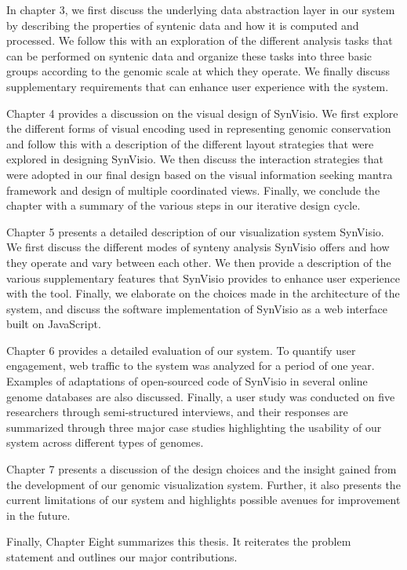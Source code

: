 In chapter 3, we first discuss the underlying data abstraction layer in our system by describing the properties of syntenic data and how it is computed and processed. We follow this with an exploration of the different analysis tasks that can be performed on syntenic data and organize these tasks into three basic groups according to the genomic scale at which they operate. We finally discuss supplementary requirements that can enhance user experience with the system.

 Chapter 4 provides a discussion on the visual design of SynVisio. We first explore the different forms of visual encoding used in representing genomic conservation and follow this with a description of the different layout strategies that were explored in designing SynVisio. We then discuss the interaction strategies that were adopted in our final design based on the visual information seeking mantra framework and design of multiple coordinated views. Finally, we conclude the chapter with a summary of the various steps in our iterative design cycle.

Chapter 5 presents a detailed description of our visualization system SynVisio. We first discuss the different modes of synteny analysis SynVisio offers and how they operate and vary between each other. We then provide a description of the various supplementary features that SynVisio provides to enhance user experience with the tool. Finally, we elaborate on the choices made in the architecture of the system,
and discuss the software implementation of SynVisio as a web interface built on JavaScript.

Chapter 6 provides a detailed evaluation of our system. To quantify user engagement, web traffic to the system was analyzed for a period of one year. Examples of adaptations of open-sourced code of SynVisio in several online genome databases are also discussed. Finally, a user study was conducted on five researchers through semi-structured interviews, and their responses are summarized through three major case studies highlighting the usability of our system across different types of genomes.

Chapter 7 presents a discussion of the design choices and the insight gained from the development of our genomic visualization system. Further, it also presents the current limitations of our system and highlights possible avenues for improvement in the future.

Finally, Chapter Eight summarizes this thesis. It reiterates the problem statement and outlines our major contributions.